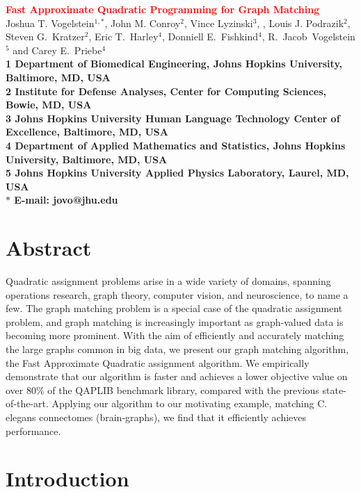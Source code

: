 \documentclass[10pt]{article}
\date{}
\begin{document}
\begin{flushleft}
{\Large
\textbf{\textcolor{red}{Fast Approximate Quadratic Programming for Graph Matching}}
}
\\
Joshua T. Vogelstein$^{1,\ast}$, John M. Conroy$^{2}$, Vince Lyzinski$^{3}$,
, Louis J. Podrazik$^{2}$,  Steven G.~Kratzer$^{2}$, Eric T.~Harley$^{4}$,
Donniell E.~Fishkind$^{4}$, 
		R.~Jacob~Vogelstein$^{5}$
        and Carey E.~Priebe$^{4}$
\\        
\bf{1} Department of Biomedical Engineering, Johns Hopkins University, Baltimore, MD, USA
\\
\bf{2} Institute for Defense Analyses, Center for Computing Sciences, Bowie, MD, USA
\\
\bf{3} Johns Hopkins University Human Language Technology Center of Excellence, Baltimore, MD, USA
\\
\bf{4} Department of Applied Mathematics and Statistics, Johns Hopkins University, Baltimore, MD, USA
\\
\bf{5}  Johns Hopkins University Applied Physics Laboratory, Laurel, MD, USA
\\
$\ast$ E-mail: jovo@jhu.edu
\end{flushleft}

 
\section*{Abstract}
Quadratic assignment problems arise in a wide variety of domains, spanning operations research, graph theory, computer vision, and neuroscience, to name a few.  The graph matching problem is a special case of the quadratic assignment problem,
and graph matching is increasingly important as
graph-valued data is becoming more prominent.  With the aim of efficiently and accurately matching the large graphs common in big data,
we present our graph matching algorithm, the Fast Approximate Quadratic assignment algorithm. 
We empirically demonstrate that our algorithm is faster and achieves a lower objective value on over $80\%$ of the QAPLIB benchmark library, compared with the previous state-of-the-art.  Applying our algorithm to our motivating example, matching C. elegans connectomes (brain-graphs), we find that it efficiently achieves  performance.


\section{Introduction}
\end{document}
